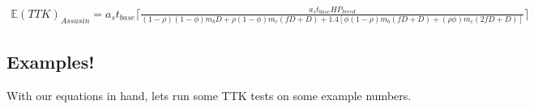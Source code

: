 \documentclass{article}
\begin{document}
\begin{align*}
\mathbb{E}(TTK)_{Assasin} = a_s t_{base} \lceil \frac{a_s t_{base}  {HP}_{breed} }{(1-\rho) (1-\phi) m_b D + \rho(1-\phi) m_c (fD + D) + 1.4[ \phi(1-\rho) m_b (fD + D) + (\rho \phi) m_c ( 2fD + D) ]} \rceil
\end{align*}
\pagebreak

\begin{comment}
\subsubsection{A Quick Side Note}
Before continuing I want to highlight something really cool about this equation. 

\begin{align*}
 \mathbb{E}(TTK)_{smiter} =  a_s t_{base} \lceil \frac{ 1.2\times D[(1-\rho) (1-\phi) m_b + \phi(1-\rho)m_b f + \rho(1-\phi) m_c f + (\rho \phi) m_c f^2 ] }{a_s t_{base} HP_{Breed}} \rceil
\end{align*}

If you are like me, you saw this factor of $a_s t_{base}$ in the denominator of the fraction and thought to yourself ``Oh wow! Look it cancels out!". But this is NOT so, as the rounding function prevents us from legally being able to do that. But what if we pretended for a moment that we could do that? Well if we could cancel out it out we would be left with:


\begin{align*}
 \mathbb{E}(TTK)_{smiter} =  \lceil \frac{ 1.2\times D[(1-\rho) (1-\phi) m_b + \phi(1-\rho)m_b f + \rho(1-\phi) m_c f + (\rho \phi) m_c f^2 ] }{ HP_{Breed}} \rceil
\end{align*}

Which is essentially

\begin{align*}
TTK = \frac{ \text{Damage Done In Set Amount of Time}}{\text{Health of Enemy}}
\end{align*}

In other words, this is the erroneous intuitive conclusion which I opened this article with: that DPS = Kill Rate. I find this fascinating, because it gives intuition into what the function of the rounding function $f(x) = \lceil x \rceil$ is doing: the rounding function is correcting for the error which is made by assuming DPS is equivalent to the kill rate.
\end{comment}

\pagebreak

\subsection{Examples!}

With our equations in hand, lets run some TTK tests on some example numbers.
\end{document}

